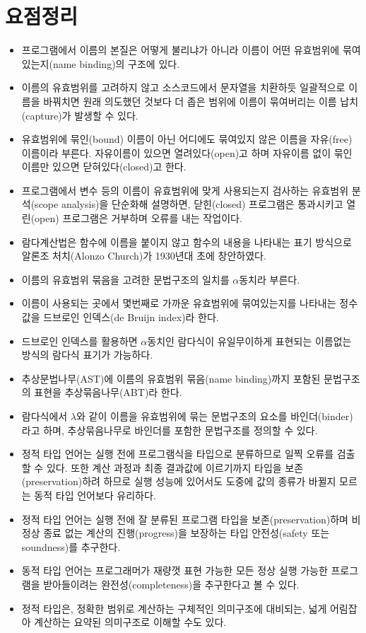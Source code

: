 \section*{요점정리}
\begin{itemize}
 \item 프로그램에서 이름의 본질은 어떻게 불리냐가 아니라 이름이
       어떤 유효범위에 묶여있는지(name binding)의 구조에 있다.
 \item 이름의 유효범위를 고려하지 않고 소스코드에서 문자열을 치환하듯
       일괄적으로 이름을 바꿔치면 원래 의도했던 것보다 더 좁은 범위에
       이름이 묶여버리는 이름 납치(capture)가 발생할 수 있다.
 \item 유효범위에 묶인(bound) 이름이 아닌 어디에도 묶여있지 않은 이름을
       자유(free)이름이라 부른다. 자유이름이 있으면 열려있다(open)고
       하며 자유이름 없이 묶인이름만 있으면 닫혀있다(closed)고 한다.
 \item 프로그램에서 변수 등의 이름이 유효범위에 맞게 사용되는지
       검사하는 유효범위 분석(scope analysis)을 단순화해 설명하면,
       닫힌(closed) 프로그램은 통과시키고 열린(open) 프로그램은
       거부하며 오류를 내는 작업이다.
 \item 람다계산법은 함수에 이름을 붙이지 않고 함수의 내용을 나타내는
       표기 방식으로 알론조 처치(Alonzo Church)가 1930년대 초에
       창안하였다.
 \item 이름의 유효범위 묶음을 고려한 문법구조의 일치를
       $\alpha$동치라 부른다.
 \item 이름이 사용되는 곳에서 몇번째로 가까운 유효범위에 묶여있는지를
       나타내는 정수값을 드브로인 인덱스(de Bruijn index)라 한다.
 \item 드브로인 인덱스를 활용하면 $\alpha$동치인 람다식이 유일무이하게
       표현되는 이름없는 방식의 람다식 표기가 가능하다.
 \item 추상문법나무(AST)에 이름의 유효범위 묶음(name binding)까지
       포함된 문법구조의 표현을 추상묶음나무(ABT)라 한다.
 \item 람다식에서 $\lambda$와 같이 이름을 유효범위에 묶는 문법구조의
       요소를 바인더(binder)라고 하며, 추상묶음나무로 바인더를
       포함한 문법구조를 정의할 수 있다.
 \item 정적 타입 언어는 실행 전에 프로그램식을 타입으로 분류하므로
       일찍 오류를 검출할 수 있다. 또한 계산 과정과 최종 결과값에
       이르기까지 타입을 보존(preservation)하려 하므로 실행 성능에
       있어서도 도중에 값의 종류가 바뀔지 모르는 동적 타입 언어보다
       유리하다.
 \item 정적 타입 언어는 실행 전에 잘 분류된 프로그램 타입을
       보존(preservation)하며 비정상 종료 없는 계산의 진행(progress)을
       보장하는 타입 안전성(safety 또는 soundness)를 추구한다.
 \item 동적 타입 언어는 프로그래머가 재량껏 표현 가능한 모든
       정상 실행 가능한 프로그램을 받아들이려는 완전성(completeness)을
       추구한다고 볼 수 있다.
 \item 정적 타입은, 정확한 범위로 계산하는 구체적인 의미구조에 대비되는,
       넓게 어림잡아 계산하는 요약된 의미구조로 이해할 수도 있다.
\end{itemize}

